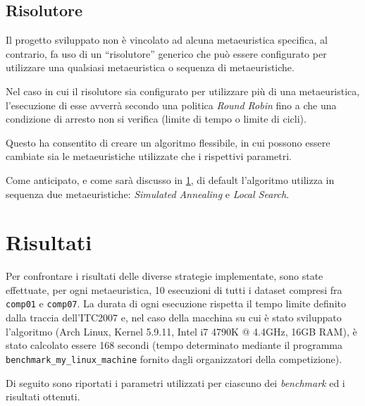\documentclass[]{article}
\newcommand{\q}[1]{``#1''}
\begin{document}
\subsection{Risolutore}
Il progetto sviluppato non è vincolato ad alcuna metaeuristica specifica, al contrario, fa uso di un \q{risolutore} generico che può essere configurato per utilizzare una qualsiasi metaeuristica o  sequenza di metaeuristiche.

Nel caso in cui il risolutore sia configurato per utilizzare più di una metaeuristica, l'esecuzione di esse avverrà secondo una politica \textit{Round Robin} fino a che una condizione di arresto non si verifica (limite di tempo o limite di cicli).

Questo ha consentito di creare un algoritmo flessibile, in cui possono essere cambiate sia le metaeuristiche utilizzate che i rispettivi parametri.

Come anticipato, e come sarà discusso in \ref{sec:risultati}, di default l'algoritmo utilizza in sequenza due metaeuristiche: \textit{Simulated Annealing} e \textit{Local Search}.

\section{Risultati}\label{sec:risultati}

Per confrontare i risultati delle diverse strategie implementate, sono state effettuate, per ogni metaeuristica, 10 esecuzioni di tutti i dataset compresi fra \texttt{comp01} e \texttt{comp07}.
La durata di ogni esecuzione rispetta il tempo limite definito dalla traccia dell'ITC2007 e, nel caso della macchina su cui è stato sviluppato l'algoritmo (Arch Linux, Kernel 5.9.11, Intel i7 4790K @ 4.4GHz, 16GB RAM), è stato calcolato essere 168 secondi (tempo determinato mediante il programma \texttt{benchmark\_my\_linux\_machine} fornito dagli organizzatori della competizione).

Di seguito sono riportati i parametri utilizzati per ciascuno dei \textit{benchmark} ed i risultati ottenuti.
\end{document}
